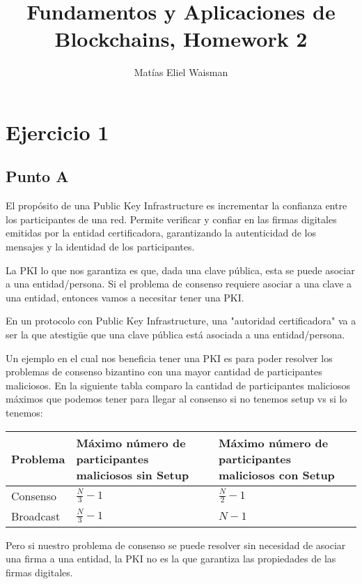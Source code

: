 \documentclass[12pt]{article}
\title{\fontsize{16}{18}\selectfont Fundamentos y Aplicaciones de Blockchains, Homework 2}
\author{Matías Eliel Waisman}
\date{}
\begin{document}
\maketitle

\section*{Ejercicio 1}

\subsection*{Punto A}

El propósito de una Public Key Infrastructure es incrementar la confianza entre los participantes de una red. Permite verificar y confiar en las firmas digitales emitidas por la entidad certificadora, garantizando la autenticidad de los mensajes y la identidad de los participantes.

La PKI lo que nos garantiza es que, dada una clave pública, esta se puede asociar a una entidad/persona. Si el problema de consenso requiere asociar a una clave a una entidad, entonces vamos a necesitar tener una PKI.

En un protocolo con Public Key Infrastructure, una "autoridad certificadora" va a ser la que atestigüe que una clave pública está asociada a una entidad/persona.

Un ejemplo en el cual nos beneficia tener una PKI es para poder resolver los problemas de consenso bizantino con una mayor cantidad de participantes maliciosos. En la siguiente tabla comparo la cantidad de participantes maliciosos máximos que podemos tener para llegar al consenso si no tenemos setup vs si lo tenemos:

\begin{center}
\begin{tabular}{|>{\centering\arraybackslash}m{3cm}|
                >{\centering\arraybackslash}m{5cm}|
                >{\centering\arraybackslash}m{5cm}|}
\hline
\textbf{Problema} & 
\textbf{Máximo número de participantes maliciosos sin Setup} & 
\textbf{Máximo número de participantes maliciosos con Setup} \\
\hline
Consenso & $\frac{N}{3} - 1$ & $\frac{N}{2} - 1$ \\
\hline
Broadcast & $\frac{N}{3} - 1$ & $N - 1$ \\
\hline
\end{tabular}
\end{center}

Pero si nuestro problema de consenso se puede resolver sin necesidad de asociar una firma a una entidad, la PKI no es la que garantiza las propiedades de las firmas digitales.
\end{document}
